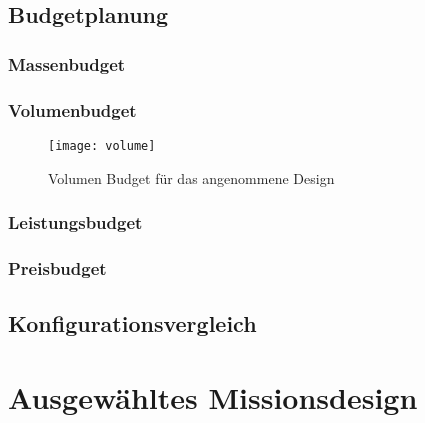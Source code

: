 				\subsection{Budgetplanung}
				
						\subsubsection{Massenbudget}
								
										
						\subsubsection{Volumenbudget}
								
										\begin{figure}[h]
											\centering
												\texttt{[image: volume]}
											\caption{Volumen Budget für das angenommene Design}
											\label{fig:volume}
										\end{figure}
								
						\subsubsection{Leistungsbudget}
						\subsubsection{Preisbudget}
				
				\subsection{Konfigurationsvergleich}
		
		\section{	Ausgewähltes Missionsdesign}
				

